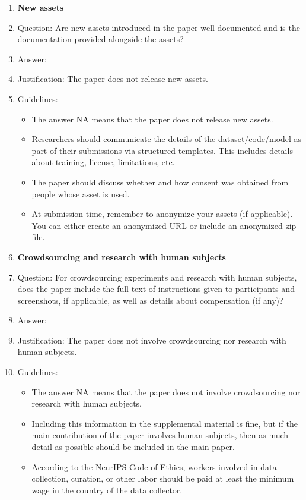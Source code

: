 \documentclass{article}
\begin{document}
\begin{enumerate}
\item {\bf New assets}
    \item[] Question: Are new assets introduced in the paper well documented and is the documentation provided alongside the assets?
    \item[] Answer: \answerNA{} %
    \item[] Justification: The paper does not release new assets.
    \item[] Guidelines:
    \begin{itemize}
        \item The answer NA means that the paper does not release new assets.
        \item Researchers should communicate the details of the dataset/code/model as part of their submissions via structured templates. This includes details about training, license, limitations, etc. 
        \item The paper should discuss whether and how consent was obtained from people whose asset is used.
        \item At submission time, remember to anonymize your assets (if applicable). You can either create an anonymized URL or include an anonymized zip file.
    \end{itemize}

\item {\bf Crowdsourcing and research with human subjects}
    \item[] Question: For crowdsourcing experiments and research with human subjects, does the paper include the full text of instructions given to participants and screenshots, if applicable, as well as details about compensation (if any)? 
    \item[] Answer: \answerNA{} %
    \item[] Justification: The paper does not involve crowdsourcing nor research with human subjects.
    \item[] Guidelines:
    \begin{itemize}
        \item The answer NA means that the paper does not involve crowdsourcing nor research with human subjects.
        \item Including this information in the supplemental material is fine, but if the main contribution of the paper involves human subjects, then as much detail as possible should be included in the main paper. 
        \item According to the NeurIPS Code of Ethics, workers involved in data collection, curation, or other labor should be paid at least the minimum wage in the country of the data collector. 
    \end{itemize}


\end{enumerate}
\end{document}
